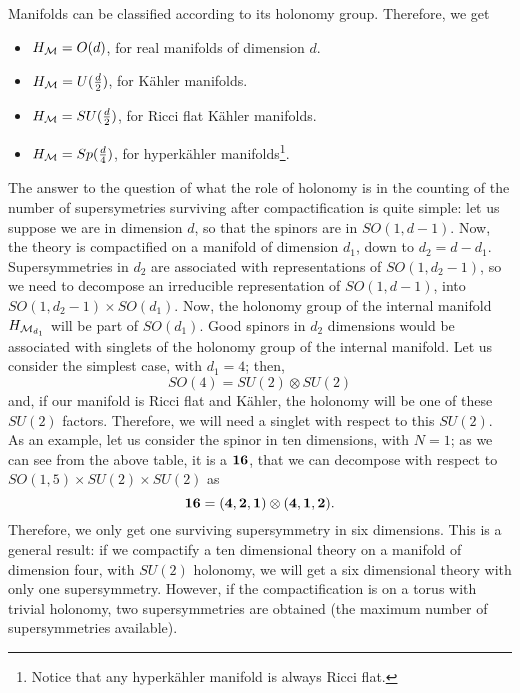 Manifolds can be classified according to its holonomy group.
Therefore, we get \cite{susyholo}
\begin{itemize}
	\item $H_{\cal M}=O(d)$, for real manifolds of dimension
$d$.
	\item $H_{\cal M}=U(\frac {d}{2})$, for K\"{a}hler
manifolds.
	\item $H_{\cal M}=SU(\frac {d}{2})$, for Ricci flat
K\"{a}hler manifolds.
	\item  $H_{\cal M}=Sp(\frac {d}{4})$, for hyperk\"{a}hler
manifolds\footnote{Notice that any hyperk\"{a}hler manifold is
always Ricci flat.}.
\end{itemize}
  
The answer to the question of what the role of holonomy is in the
counting of the number of supersymetries surviving after
compactification is quite simple: let us suppose we are in
dimension $d$, so that the spinors are in $SO(1,d-1)$. Now, the
theory is compactified on a manifold of dimension $d_1$, down to
$d_2=d-d_1$. Supersymmetries in $d_2$ are associated with
representations of $SO(1,d_2-1)$, so we need to decompose an
irreducible representation of $SO(1,d-1)$, into
$SO(1,d_2-1) \times SO(d_1)$. Now, the holonomy group of the
internal manifold $H_{{\cal M}_{d_1}}$ will be part of $SO(d_1)$.
Good spinors in $d_2$ dimensions would be associated with
singlets of the holonomy group of the internal manifold. Let us
consider the simplest case, with $d_1=4$; then,
\begin{equation}
SO(4) = SU(2) \otimes SU(2)
\label{eq:a3}
\end{equation}
and, if our manifold is Ricci flat and K\"{a}hler, the holonomy
will be one of these $SU(2)$ factors. Therefore, we will need a
singlet with respect to this $SU(2)$. As an example, let us
consider the spinor in ten dimensions, with $N\!=\!1$; as we can
see from the above table, it is a ${\bf 16}$, that we can decompose
with respect to $SO(1,5) \times SU(2) \times SU(2)$ as
\begin{equation}
{\bf 16} = ({\bf 4},{\bf 2},{\bf 1})\otimes ({\bf 4},{\bf 1},{\bf
2}).
\label{eq:a4}
\end{equation}
Therefore, we only get one surviving supersymmetry in six
dimensions. This is a general result: if we compactify a ten
dimensional theory on a manifold of dimension four, with $SU(2)$
holonomy, we will get a six dimensional theory with only one
supersymmetry. However, if the compactification is on a torus
with trivial holonomy, two supersymmetries are obtained (the
maximum number of supersymmetries available).

